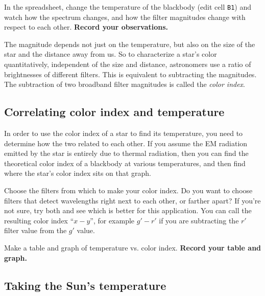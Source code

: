 \begin{steps}
	\item\label{ic:step:see-thermal} In the spreadsheet, change the temperature of the blackbody (edit cell \texttt{B1}) and watch how the spectrum changes, and how the filter magnitudes change with respect to each other. \textbf{Record your observations.}
\end{steps}
	
The magnitude depends not just on the temperature, but also on the size of the star and the distance away from us. So to characterize a star's color quantitatively, independent of the size and distance, astronomers use a ratio of brightnesses of different filters. This is equivalent to subtracting the magnitudes. The subtraction of two broadband filter magnitudes is called the \textit{color index}.

\subsection{Correlating color index and temperature}

In order to use the color index of a star to find its temperature, you need to determine how the two related to each other. If you assume the EM radiation emitted by the star is entirely due to thermal radiation, then you can find the theoretical color index of a blackbody at various temperatures, and then find where the star's color index sits on that graph.

\begin{steps}
	\item Choose the filters from which to make your color index. Do you want to choose filters that detect wavelengths right next to each other, or farther apart? If you're not sure, try both and see which is better for this application. You can call the resulting color index ``$x - y$'', for example $g' - r'$ if you are subtracting the $r'$ filter value from the $g'$ value.
	
	\item\label{ic:step:tempcolor} Make a table and graph of temperature vs. color index. \textbf{Record your table and graph.}
\end{steps}

\subsection{Taking the Sun's temperature}

